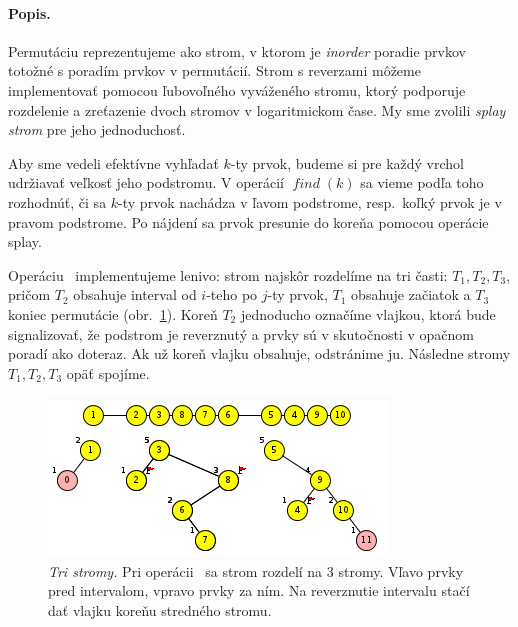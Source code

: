 \paragraph{Popis.}
Permutáciu reprezentujeme ako strom, v ktorom je \emph{inorder} poradie prvkov totožné 
s poradím prvkov v permutácií. Strom s reverzami môžeme implementovať pomocou ľubovoľného 
vyváženého stromu, ktorý podporuje rozdelenie a zreťazenie dvoch stromov v logaritmickom čase. 
My sme zvolili \emph{splay strom} pre jeho jednoduchosť. 


Aby sme vedeli efektívne vyhľadať $k$-ty prvok, budeme si pre každý vrchol udržiavať veľkosť jeho
podstromu. V operácií $\mathop{\mathit{find}}(k)$ sa vieme podľa toho rozhodnúť, či sa $k$-ty prvok nachádza v ľavom podstrome,
resp.\ koľký prvok je v pravom podstrome. Po nájdení sa prvok presunie do koreňa pomocou operácie splay.

Operáciu \reverse\ implementujeme lenivo: 
strom najskôr rozdelíme na tri časti: $T_1,T_2,T_3$, pričom $T_2$ obsahuje interval od $i$-teho 
po $j$-ty prvok, $T_1$ obsahuje začiatok a $T_3$ koniec permutácie (obr.~\ref{img:rev2}). 
Koreň $T_2$ jednoducho označíme vlajkou, ktorá bude signalizovať, že podstrom je reverznutý a 
prvky sú v skutočnosti v opačnom poradí ako doteraz. Ak už koreň vlajku obsahuje, odstránime ju. 
Následne stromy $T_1,T_2,T_3$ opäť spojíme.


\begin{figure}
\includegraphics[width=\columnwidth]{obrazky/rev3trees.png}
\caption{\emph{Tri stromy.} Pri operácii \reverse\ sa strom rozdelí na 3 stromy. 
Vľavo prvky pred intervalom, vpravo prvky za ním. 
Na reverznutie intervalu stačí dať vlajku koreňu stredného stromu.}
\label{img:rev2}
\end{figure}

